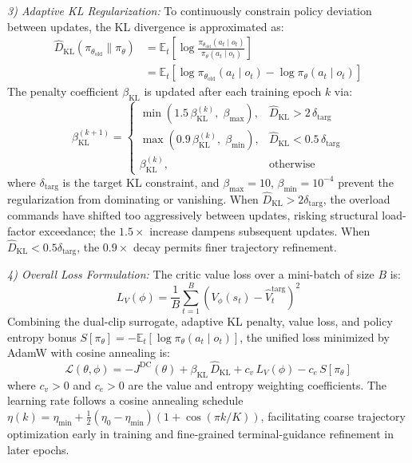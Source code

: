 \documentclass[lettersize,journal]{IEEEtran}
\begin{document}
\emph{3) Adaptive KL Regularization:} To continuously constrain policy deviation between updates, the KL divergence is approximated as:
\begin{equation}
\label{eq:kl_approx}
\begin{split}
\hat{D}_{\mathrm{KL}}\!\left(\pi_{\theta_{\mathrm{old}}} \| \pi_\theta\right) &= \mathbb{E}_t\!\left[\log\frac{\pi_{\theta_{\mathrm{old}}}(a_t \mid o_t)}{\pi_\theta(a_t \mid o_t)}\right] \\
&= \mathbb{E}_t\!\left[\log\pi_{\theta_{\mathrm{old}}}(a_t \mid o_t) - \log\pi_\theta(a_t \mid o_t)\right]
\end{split}
\end{equation}
The penalty coefficient $\beta_{\mathrm{KL}}$ is updated after each training epoch $k$ via:
\begin{equation}
\label{eq:kl_adapt}
\beta_{\mathrm{KL}}^{(k+1)} =
\begin{cases}
\min\!\left(1.5\,\beta_{\mathrm{KL}}^{(k)},\; \beta_{\max}\right), & \hat{D}_{\mathrm{KL}} > 2\,\delta_{\mathrm{targ}} \\[6pt]
\max\!\left(0.9\,\beta_{\mathrm{KL}}^{(k)},\; \beta_{\min}\right), & \hat{D}_{\mathrm{KL}} < 0.5\,\delta_{\mathrm{targ}} \\[6pt]
\beta_{\mathrm{KL}}^{(k)}, & \text{otherwise}
\end{cases}
\end{equation}
where $\delta_{\mathrm{targ}}$ is the target KL constraint, and $\beta_{\max}=10$, $\beta_{\min}=10^{-4}$ prevent the regularization from dominating or vanishing. When $\hat{D}_{\mathrm{KL}} > 2\delta_{\mathrm{targ}}$, the overload commands have shifted too aggressively between updates, risking structural load-factor exceedance; the $1.5\times$ increase dampens subsequent updates. When $\hat{D}_{\mathrm{KL}} < 0.5\delta_{\mathrm{targ}}$, the $0.9\times$ decay permits finer trajectory refinement.

\emph{4) Overall Loss Formulation:} The critic value loss over a mini-batch of size $B$ is:
\begin{equation}
\label{eq:value_loss}
L_V(\phi) = \frac{1}{B}\sum_{t=1}^{B} \left(V_\phi(s_t) - \hat{V}_t^{\mathrm{targ}}\right)^2
\end{equation}
Combining the dual-clip surrogate, adaptive KL penalty, value loss, and policy entropy bonus $S[\pi_\theta] = -\mathbb{E}_t[\log\pi_\theta(a_t \mid o_t)]$, the unified loss minimized by AdamW with cosine annealing is:
\begin{equation}
\label{eq:total_loss}
\mathcal{L}(\theta,\phi) = - J^{\mathrm{DC}}(\theta) + \beta_{\mathrm{KL}}\,\hat{D}_{\mathrm{KL}} + c_v\,L_V(\phi) - c_e\,S[\pi_\theta]
\end{equation}
where $c_v > 0$ and $c_e > 0$ are the value and entropy weighting coefficients. The learning rate follows a cosine annealing schedule $\eta(k) = \eta_{\min} + \frac{1}{2}(\eta_0 - \eta_{\min})(1 + \cos(\pi k / K))$, facilitating coarse trajectory optimization early in training and fine-grained terminal-guidance refinement in later epochs.
\end{document}
